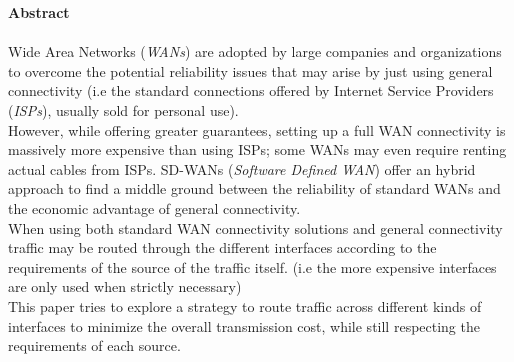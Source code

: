 \pagebreak
\thispagestyle{empty}
\hspace{0pt}
\vfill
\textbf{Abstract} \\
\vspace{0.2cm}
 \\
	Wide Area Networks (\textit{WANs})  are adopted by large companies and organizations to overcome the potential reliability issues that may arise by just using general connectivity (i.e the standard connections offered by Internet Service Providers (\textit{ISPs}), usually sold for personal use). \\
	However, while offering greater guarantees, setting up a full WAN connectivity is massively more expensive than using ISPs; some WANs may even require renting actual cables from ISPs.
	SD-WANs (\textit{Software Defined WAN}) offer an hybrid approach to find a middle ground between the reliability of standard WANs and the economic advantage of general connectivity. \\
	When using both standard WAN connectivity solutions and general connectivity traffic may be routed through the different interfaces according to the requirements of the source of the traffic itself. (i.e the more expensive interfaces are only used when strictly necessary) \\
	This paper tries to explore a strategy to route traffic across different kinds of interfaces to minimize the overall transmission cost, while still respecting the requirements of each source.

\vfill
\hspace{0pt}
\pagebreak